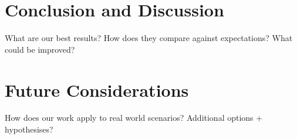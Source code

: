 \documentclass{article}
\begin{document}
\section{Conclusion and Discussion}

What are our best results? How does they compare against expectations? What could be improved? 

\section{Future Considerations}

How does our work apply to real world scenarios? Additional options + hypothesises?




\end{document}
